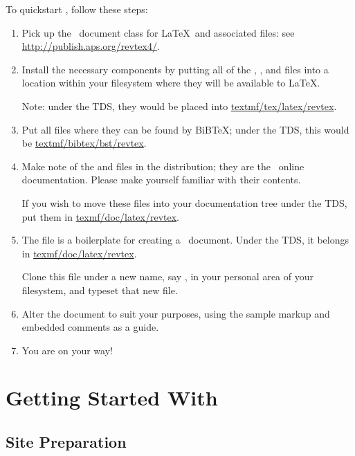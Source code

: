 \documentclass[%
prl%
,twocolumngrid%
,secnumarabic%
,amssymb]{revtex4}
\begin{document}
To quickstart \revtex, follow these steps:
\begin{enumerate}
\item
Pick up the \revtex\ document class for \LaTeX\ and associated files:
see \url{http://publish.aps.org/revtex4/}.

\item
Install the necessary components
by putting all of the , , and  files
into a location within your filesystem where they will be available to \LaTeX.

Note: under the TDS, they would be placed into \url{textmf/tex/latex/revtex}.

\item
Put all  files where they can be found by BiB\TeX; under the TDS, this 
would be \url{textmf/bibtex/bst/revtex}.

\item
Make note of the  and  files in the distribution; they
are the \revtex\ online documentation.
Please make yourself familiar with their contents.

If you wish to move these files into your documentation tree under the TDS, put them in
\url{texmf/doc/latex/revtex}.

\item
The file  is a boilerplate for creating a \revtex\ document.
Under the TDS, it belongs in \url{texmf/doc/latex/revtex}.

Clone this file under a new name, say , in your personal area of your filesystem,
and typeset that new file.

\item
Alter the document to suit your purposes,
using the sample markup and embedded comments as a guide.

\item
You are on your way!

\end{enumerate}

\section{Getting Started With \revtex}\label{sec:getting}

\subsection{Site Preparation}\label{sec:prep}
\end{document}
